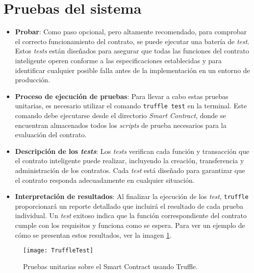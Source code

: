 \section{Pruebas del sistema}

\begin{itemize}

\item \textbf{Probar}: Como paso opcional, pero altamente recomendado, para comprobar el correcto funcionamiento del contrato, se puede ejecutar una batería de \textit{test}. Estos \textit{tests} están diseñados para asegurar que todas las funciones del contrato inteligente operen conforme a las especificaciones establecidas y para identificar cualquier posible falla antes de la implementación en un entorno de producción.
	
\item \textbf{Proceso de ejecución de pruebas}: Para llevar a cabo estas pruebas unitarias, es necesario utilizar el comando \texttt{truffle test} en la terminal. Este comando debe ejecutarse desde el directorio \textit{Smart Contract}, donde se encuentran almacenados todos los \textit{scripts} de prueba necesarios para la evaluación del contrato.

\item \textbf{Descripción de los \textit{tests}}: 
Los \textit{tests} verifican cada función y transacción que el
contrato inteligente puede realizar, incluyendo la creación,
transferencia y administración de los contratos.
Cada \textit{test} está diseñado para garantizar que el contrato responda adecuadamente en cualquier situación.

\item \textbf{Interpretación de resultados}: Al finalizar la ejecución de los \textit{test}, \texttt{truffle} proporcionará un reporte detallado que incluirá el resultado de cada prueba individual.
Un \textit{test} exitoso indica que la función correspondiente del contrato cumple con los requisitos y funciona como se espera. 
Para ver un ejemplo de cómo se presentan estos resultados, ver la imagen \ref{fig:TruffleTest}.

\end{itemize}

\begin{figure}[h]
	\centering
	\texttt{[image: TruffleTest]}
	\caption[Pruebas sobre el contrato]{Pruebas unitarias sobre el Smart Contract usando Truffle.}
	\label{fig:TruffleTest}
\end{figure}	

